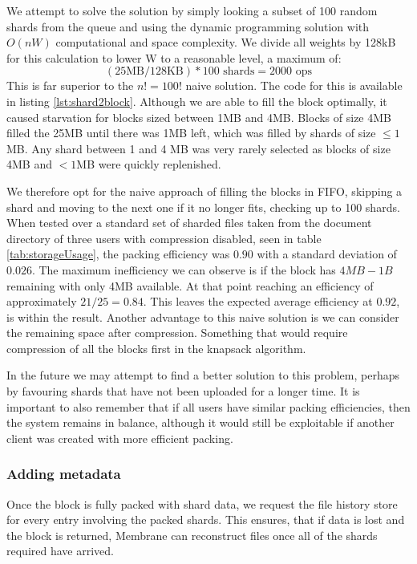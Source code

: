 \documentclass[11pt, a4paper, twoside]{report}
\begin{document}
We attempt to solve the solution by simply looking a subset of 100 random shards from the queue and using the dynamic programming solution with $O(nW)$ computational and space complexity. \citep{martello1999dynamic} We divide all weights by 128kB for this calculation to lower W to a reasonable level, a maximum of: 
$$(25\mbox{MB} / 128\mbox{KB}) * 100  \mbox{ shards} = 2000 \mbox{ ops}$$ 
This is far superior to the $n! = 100!$ naive solution. The code for this is available in listing \ref{lst:shard2block}. Although we are able to fill the block optimally, it caused starvation for blocks sized between 1MB and 4MB. Blocks of size 4MB filled the 25MB until there was 1MB left, which was filled by shards of size $\leq1$MB. Any shard between 1 and 4 MB was very rarely selected as blocks of size 4MB and $<1$MB were quickly replenished.

We therefore opt for the naive approach of filling the blocks in FIFO, skipping a shard and moving to the next one if it no longer fits, checking up to 100 shards. When tested over a standard set of sharded files taken from the document directory of three users with compression disabled, seen in table \ref{tab:storageUsage}, the packing efficiency was $0.90$ with a standard deviation of $0.026$. The maximum inefficiency we can observe is if the block has $4MB - 1B$ remaining with only 4MB available. At that point reaching an efficiency of approximately $21/25 = 0.84$. This leaves the expected average efficiency at $0.92$, is within the result. Another advantage to this naive solution is we can consider the remaining space after compression. Something that would require compression of all the blocks first in the knapsack algorithm.

In the future we may attempt to find a better solution to this problem, perhaps by favouring shards that have not been uploaded for a longer time. It is important to also remember that if all users have similar packing efficiencies, then the system remains in balance, although it would still be exploitable if another client was created with more efficient packing.

\subsubsection{Adding metadata}

Once the block is fully packed with shard data, we request the file history store for every entry involving the packed shards. This ensures, that if data is lost and the block is returned, Membrane can reconstruct files once all of the shards required have arrived.
\end{document}
